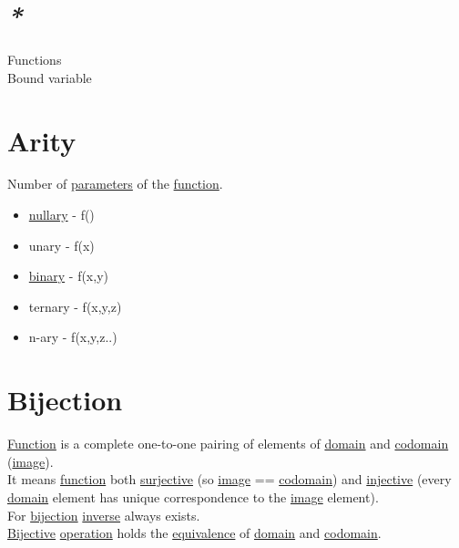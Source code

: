 \documentclass[a4paper,14pt,oneside]{book}
\begin{document}
\section{\emph{*}}
\label{sec:org4b8f5d5}

\label{org0bd6046}Functions\\
\label{org0866335}Bound variable\\

\section{\label{org7bee5cc}Arity}
\label{sec:orged5e0c0}
Number of \hyperref[orga6d94f6]{parameters} of the \hyperref[org8cc2ae4]{function}.\\
\begin{itemize}
\item \hyperref[org6c1bd06]{nullary} - f()\\
\item unary   - f(x)\\
\item \hyperref[orgd0575cd]{binary}  - f(x,y)\\
\item ternary - f(x,y,z)\\
\item n-ary   - f(x,y,z..)\\
\end{itemize}

\section{\label{org5fe2be8}Bijection}
\label{sec:org79a030a}
\hyperref[org8cc2ae4]{Function} is a complete one-to-one pairing of elements of \hyperref[orgeb6ec49]{domain} and \hyperref[org71c95ef]{codomain} (\hyperref[orga531a2e]{image}).\\
It means \hyperref[org8cc2ae4]{function} both \hyperref[orgaa24a87]{surjective} (so \hyperref[orga531a2e]{image} == \hyperref[org71c95ef]{codomain}) and \hyperref[orgcdc23e2]{injective} (every \hyperref[orgeb6ec49]{domain} element has unique correspondence to the \hyperref[orga531a2e]{image} element).\\

For \hyperref[org5fe2be8]{bijection} \hyperref[org51e2137]{inverse} always exists.\\

\hyperref[org6e41362]{Bijective} \hyperref[org6ed0c27]{operation} holds the \hyperref[org663eda7]{equivalence} of \hyperref[orgeb6ec49]{domain} and \hyperref[org71c95ef]{codomain}.\\
\end{document}
